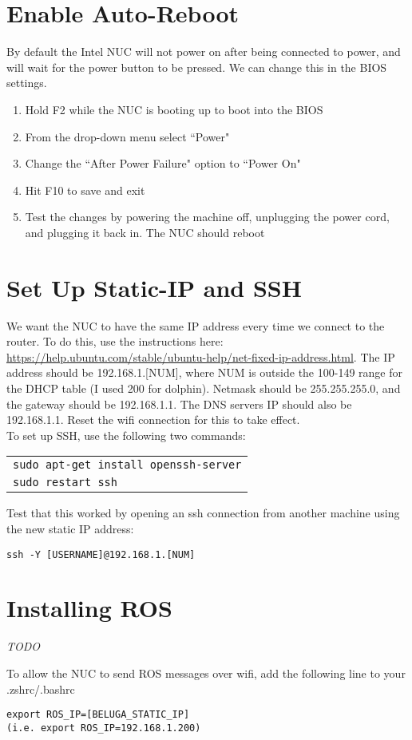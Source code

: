 \documentclass{article}
\newcommand{\todo}{ \begin{center} \large \emph{TODO} \end{center}}
\begin{document}
\section*{Enable Auto-Reboot}
By default the Intel NUC will not power on after being connected to power, and will wait for the power button to be pressed.
We can change this in the BIOS settings.
\begin{enumerate}[nosep]
\item Hold F2 while the NUC is booting up to boot into the BIOS
\item From the drop-down menu select ``Power"
\item Change the ``After Power Failure" option to ``Power On"
\item Hit F10 to save and exit
\item Test the changes by powering the machine off, unplugging the power cord, and plugging it back in. The NUC should reboot
\end{enumerate}

\section*{Set Up Static-IP and SSH}
We want the NUC to have the same IP address every time we connect to the router.
To do this, use the instructions here: \url{https://help.ubuntu.com/stable/ubuntu-help/net-fixed-ip-address.html}.
The IP address should be 192.168.1.[NUM], where NUM is outside the 100-149 range for the DHCP table (I used 200 for dolphin).
Netmask should be 255.255.255.0, and the gateway should be 192.168.1.1.
The DNS servers IP should also be 192.168.1.1.
Reset the wifi connection for this to take effect.\\

To set up SSH, use the following two commands:
\begin{center}
\begin{tabular}{l}
\texttt{sudo apt-get install openssh-server} \\
\texttt{sudo restart ssh}
\end{tabular}
\end{center}
Test that this worked by opening an ssh connection from another machine using the new static IP address:
\begin{center}
\texttt{ssh -Y [USERNAME]@192.168.1.[NUM]}
\end{center}

\section*{Installing ROS}
\todo
To allow the NUC to send ROS messages over wifi, add the following line to your .zshrc/.bashrc 
\begin{verbatim}
export ROS_IP=[BELUGA_STATIC_IP]
(i.e. export ROS_IP=192.168.1.200)
\end{verbatim}
\end{document}
